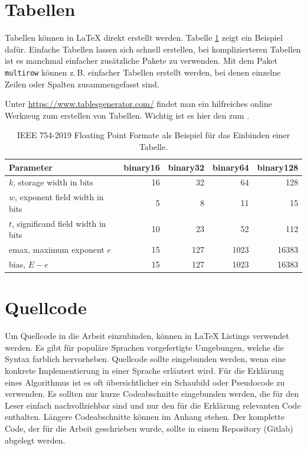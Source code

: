 \section{Tabellen}
Tabellen können in \LaTeX{} direkt erstellt werden. Tabelle \ref{tab:ieee_formats} zeigt ein Beispiel dafür. Einfache Tabellen lassen sich schnell erstellen, bei komplizierteren Tabellen ist es manchmal einfacher zusätzliche Pakete zu verwenden. Mit dem Paket \texttt{multirow} können z.\,B. einfacher Tabellen erstellt werden, bei denen einzelne Zeilen oder Spalten zusammengefasst sind. 

Unter \url{https://www.tablesgenerator.com/} findet man ein hilfreiches online Werkzeug zum erstellen von Tabellen. Wichtig ist es hier den  zum . 

\begin{table}[ht]
\centering
\begin{tabular}{lrrrr} 
 \toprule
 Parameter & binary16 & binary32 & binary64 & binary128 \\
 \midrule
  $k$, storage width in bits           & 16 &  32 &   64 &   128 \\ 
  $w$, exponent field width in bits    &  5 &   8 &   11 &    15 \\
  $t$, significand field width in bits & 10 &  23 &   52 &   112 \\
  emax, maximum exponent $e$           & 15 & 127 & 1023 & 16383 \\
  bias, $E-e$                          & 15 & 127 & 1023 & 16383 \\
 \bottomrule
\end{tabular}
\caption{IEEE 754-2019 Floating Point Formate als Beispiel für das Einbinden einer Tabelle.}
\label{tab:ieee_formats}
\end{table}

\section{Quellcode}
Um Quellcode in die Arbeit einzubinden, können in \LaTeX{} Listings verwendet werden. Es gibt für populäre Sprachen vorgefertigte Umgebungen, welche die Syntax farblich hervorheben. Quellcode sollte eingebunden werden, wenn eine konkrete Implementierung in einer Sprache erläutert wird. Für die Erklärung eines Algorithmus ist es oft übersichtlicher ein Schaubild oder Pseudocode zu verwenden. Es sollten nur kurze Codeabschnitte eingebunden werden, die für den Leser einfach nachvollziehbar sind und nur den für die Erklärung relevanten Code enthalten. Längere Codeabschnitte können im Anhang stehen. Der komplette Code, der für die Arbeit geschrieben wurde, sollte in einem Repository (Gitlab) %
abgelegt werden.

